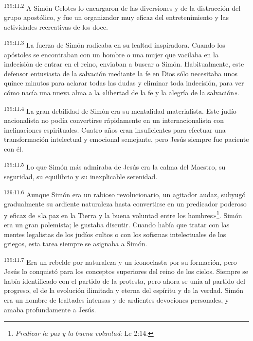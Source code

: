 \par 
\textsuperscript{139:11.2} A Simón Celotes lo encargaron de las diversiones y de la distracción del grupo apostólico, y fue un organizador muy eficaz del entretenimiento y las actividades recreativas de los doce.

\par 
\textsuperscript{139:11.3} La fuerza de Simón radicaba en su lealtad inspiradora. Cuando los apóstoles se encontraban con un hombre o una mujer que vacilaba en la indecisión de entrar en el reino, enviaban a buscar a Simón. Habitualmente, este defensor entusiasta de la salvación mediante la fe en Dios sólo necesitaba unos quince minutos para aclarar todas las dudas y eliminar toda indecisión, para ver cómo nacía una nueva alma a la «libertad de la fe y la alegría de la salvación».

\par 
\textsuperscript{139:11.4} La gran debilidad de Simón era su mentalidad materialista. Este judío nacionalista no podía convertirse rápidamente en un internacionalista con inclinaciones espirituales. Cuatro años eran insuficientes para efectuar una transformación intelectual y emocional semejante, pero Jesús siempre fue paciente con él.

\par 
\textsuperscript{139:11.5} Lo que Simón más admiraba de Jesús era la calma del Maestro, su seguridad, su equilibrio y su inexplicable serenidad.

\par 
\textsuperscript{139:11.6} Aunque Simón era un rabioso revolucionario, un agitador audaz, subyugó gradualmente su ardiente naturaleza hasta convertirse en un predicador poderoso y eficaz de «la paz en la Tierra y la buena voluntad entre los hombres»\footnote{\textit{Predicar la paz y la buena voluntad}: Lc 2:14.}. Simón era un gran polemista; le gustaba discutir. Cuando había que tratar con las mentes legalistas de los judíos cultos o con los sofismas intelectuales de los griegos, esta tarea siempre se asignaba a Simón.

\par 
\textsuperscript{139:11.7} Era un rebelde por naturaleza y un iconoclasta por su formación, pero Jesús lo conquistó para los conceptos superiores del reino de los cielos. Siempre se había identificado con el partido de la protesta, pero ahora se unía al partido del progreso, el de la evolución ilimitada y eterna del espíritu y de la verdad. Simón era un hombre de lealtades intensas y de ardientes devociones personales, y amaba profundamente a Jesús.

